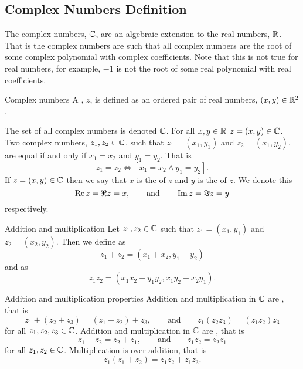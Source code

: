 \documentclass{article}
\begin{document}
    \subsection{Complex Numbers Definition}
    The complex numbers, \(\mathbb{C}\), are an algebraic extension to the real numbers, \(\mathbb{R}\).
    That is the complex numbers are such that all complex numbers are the root of some complex polynomial with complex coefficients.
    Note that this is not true for real numbers, for example, \(-1\) is not the root of some real polynomial with real coefficients.
    \begin{definition}{Complex numbers}{}
        A , \(z\), is defined as an ordered pair of real numbers, \((x, y)\in\mathbb{R}^2\).
        
    \end{definition}
    The set of all complex numbers is denoted \(\mathbb{C}\).
    For all \(x, y\in\mathbb{R}\) \(z = (x, y) \in\mathbb{C}\).
    Two complex numbers, \(z_1, z_2 \in\mathbb{C}\), such that \(z_1 = (x_1, y_1)\) and \(z_2 = (x_1, y_2)\), are equal if and only if \(x_1 = x_2\) and \(y_1 = y_2\).
    That is
    \[z_1 = z_2 \iff [x_1 = x_2 \wedge y_1 = y_2].\]
    If \(z = (x, y)\in\mathbb{C}\) then we say that \(x\) is the  of \(z\) and \(y\) is the  of \(z\).
    We denote this
    \[\Re z = \real z = x, \qquad\text{and}\qquad \Im z = \imaginary z = y\]
    respectively.
    \begin{definition}{Addition and multiplication}{}
        Let \(z_1, z_2\in\mathbb{C}\) such that \(z_1 = (x_1, y_1)\) and \(z_2 = (x_2, y_2)\).
        Then we define  as
        \[z_1 + z_2 = (x_1 + x_2, y_1 + y_2)\]
        and  as
        \[z_1z_2 = (x_1x_2 - y_1y_2, x_1y_2 + x_2y_1).\]
    \end{definition}
    \begin{lemma}{Addition and multiplication properties}{}
        Addition and multiplication in \(\mathbb{C}\) are , that is
        \[z_1 + (z_2 + z_3) = (z_1 + z_2) + z_3, \qquad\text{and}\qquad z_1(z_2z_3) = (z_1z_2)z_3\]
        for all \(z_1, z_2, z_3\in\mathbb{C}\).
        Addition and multiplication in \(\mathbb{C}\) are , that is
        \[z_1 + z_2 = z_2 + z_1, \qquad\text{and}\qquad z_1z_2 = z_2z_1\]
        for all \(z_1, z_2 \in \mathbb{C}\).
        Multiplication is  over addition, that is
        \[z_1(z_1 + z_2) = z_1z_2 + z_1z_3.\]
    \end{lemma}
\end{document}

